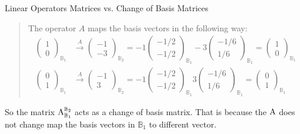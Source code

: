 \begin{example}{Linear Operators Matrices vs. Change of Basis Matrices}
	\begin{quotation}
		The operator $ A $ maps the basis vectors in the following way:
		\begin{align*}
			\begin{pmatrix}
				1	\\
				0	
			\end{pmatrix}_{\mathbb{B}_1} & \xrightarrow{A} 
			\begin{pmatrix}
				-1	\\
				-3
			\end{pmatrix}_{\mathbb{B}_2} = 
			-1 \begin{pmatrix}
				-1/2	\\
				-1/2
			\end{pmatrix}_{\mathbb{B}_1}
			-3 \begin{pmatrix}
				-1/6	\\
				1/6
			\end{pmatrix}_{\mathbb{B}_1} = 
			\begin{pmatrix}
				1	\\
				0
			\end{pmatrix}_{\mathbb{B}_1}\\
			\begin{pmatrix}
				0	\\
				1	
			\end{pmatrix}_{\mathbb{B}_1} & \xrightarrow{A} \begin{pmatrix}
				-1	\\
				3
			\end{pmatrix}_{\mathbb{B}_2} = 
			-1 \begin{pmatrix}
				-1/2	\\
				-1/2
			\end{pmatrix}_{\mathbb{B}_1}
			3 \begin{pmatrix}
				-1/6	\\
				1/6
			\end{pmatrix}_{\mathbb{B}_1} = 
			\begin{pmatrix}
				0	\\
				1
			\end{pmatrix}_{\mathbb{B}_1}
		\end{align*}
	\end{quotation}
	
	So the matrix $ \operatorname{A}_{\mathbb{B}_1}^{\mathbb{B}_2} $ acts as a change of basis matrix. That is because the $ \operatorname{A} $ does not change map the basis vectors in $ \mathbb{B}_1 $ to different vector.

	
\end{example}


